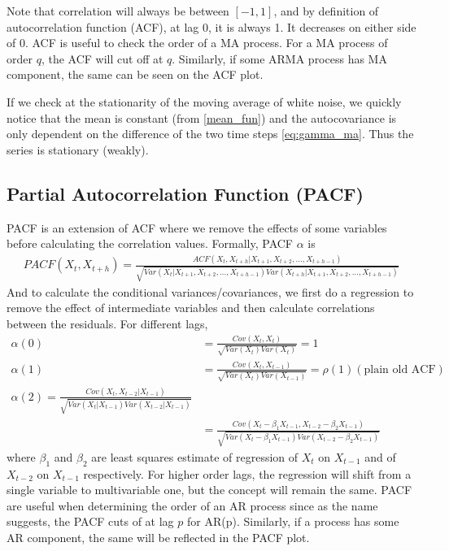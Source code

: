 \documentclass[../../time_series_notes.tex]{subfiles}
\begin{document}
Note that correlation will always be between $[-1,1]$, and by definition of autocorrelation function (ACF), at lag 0, it is always 1. It decreases on either side of 0. ACF is useful to check the order of a MA process. For a MA process of order $q$, the ACF will cut off at $q$. Similarly, if some ARMA process has MA component, the same can be seen on the ACF plot.\newline

If we check at the stationarity of the moving average of white noise, we quickly notice that the mean is constant (from \ref{mean_fun}) and the autocovariance is only dependent on the difference of the two time steps \eqref{eq:gamma_ma}. Thus the series is stationary (weakly).

\subsection{Partial Autocorrelation Function (PACF)}
PACF is an extension of ACF where we remove the effects of some variables before calculating the correlation values. Formally, PACF $\alpha$ is
\begin{align*}
    PACF(X_{t},X_{t+h}) = \frac{ACF(X_{t},X_{t+h}|X_{t+1},X_{t+2},\ldots,X_{t+h-1})}{\sqrt{Var(X_{t}|X_{t+1},X_{t+2},\ldots,X_{t+h-1})Var(X_{t+h}|X_{t+1},X_{t+2},\ldots,X_{t+h-1})}}
\end{align*}
And to calculate the conditional variances/covariances, we first do a regression to remove the effect of intermediate variables and then calculate correlations between the residuals. For different lags,
\begin{align*}
    \alpha(0) &= \frac{Cov(X_{t}, X_{t})}{\sqrt{Var(X_{t})Var(X_{t})}} = 1\\
    \alpha(1) &= \frac{Cov(X_{t}, X_{t-1})}{\sqrt{Var(X_{t})Var(X_{t-1})}} = \rho(1) (\text{plain old ACF})\\
    \alpha(2) = \frac{Cov(X_{t}, X_{t-2} \rvert X_{t-1})}{\sqrt{Var(X_{t} \lvert X_{t-1})Var(X_{t-2} \lvert X_{t-1})}}\\
    &= \frac{Cov(X_{t} - \beta_{1}X_{t-1}, X_{t-2} - \beta_{2}X_{t-1})}{\sqrt{Var(X_{t} - \beta_{1}X_{t-1})Var(X_{t-2} - \beta_{2}X_{t-1})}}
\end{align*}
where $\beta_{1}$ and $\beta_{2}$ are least squares estimate of regression of $X_{t}$ on $X_{t-1}$ and of $X_{t-2}$ on $X_{t-1}$ respectively. For higher order lags, the regression will shift from a single variable to multivariable one, but the concept will remain the same. PACF are useful when determining the order of an AR process since as the name suggests, the PACF cuts of at lag $p$ for AR(p). Similarly, if a process has some AR component, the same will be reflected in the PACF plot.
\end{document}
